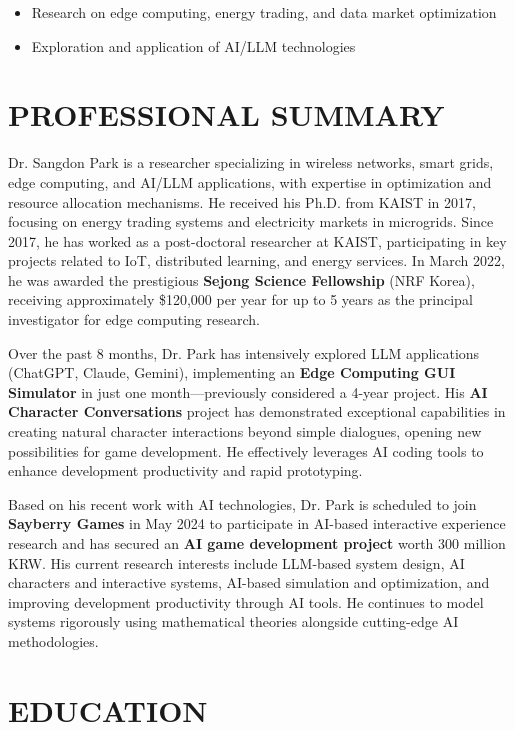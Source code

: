\documentclass[11pt,a4paper]{article}
\begin{document}
\begin{itemize}
    \item Research on edge computing, energy trading, and data market optimization
    \item Exploration and application of AI/LLM technologies
\end{itemize}

\section{PROFESSIONAL SUMMARY}

Dr. Sangdon Park is a researcher specializing in wireless networks, smart grids, edge computing, and AI/LLM applications, with expertise in optimization and resource allocation mechanisms. He received his Ph.D. from KAIST in 2017, focusing on energy trading systems and electricity markets in microgrids. Since 2017, he has worked as a post-doctoral researcher at KAIST, participating in key projects related to IoT, distributed learning, and energy services. In March 2022, he was awarded the prestigious \textbf{Sejong Science Fellowship} (NRF Korea), receiving approximately \$120,000 per year for up to 5 years as the principal investigator for edge computing research.

Over the past 8 months, Dr. Park has intensively explored LLM applications (ChatGPT, Claude, Gemini), implementing an \textbf{Edge Computing GUI Simulator} in just one month—previously considered a 4-year project. His \textbf{AI Character Conversations} project has demonstrated exceptional capabilities in creating natural character interactions beyond simple dialogues, opening new possibilities for game development. He effectively leverages AI coding tools to enhance development productivity and rapid prototyping.

Based on his recent work with AI technologies, Dr. Park is scheduled to join \textbf{Sayberry Games} in May 2024 to participate in AI-based interactive experience research and has secured an \textbf{AI game development project} worth 300 million KRW. His current research interests include LLM-based system design, AI characters and interactive systems, AI-based simulation and optimization, and improving development productivity through AI tools. He continues to model systems rigorously using mathematical theories alongside cutting-edge AI methodologies.

\section{EDUCATION}
\end{document}
